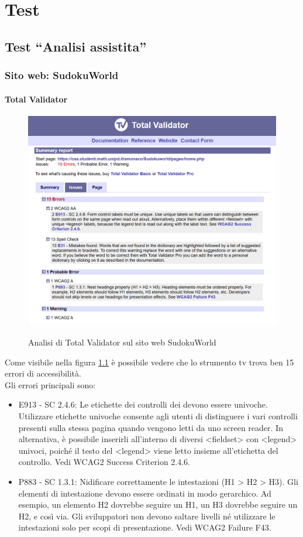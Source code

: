 \chapter{Test}
\label{chap:test}

\section{Test ``Analisi assistita''}

\subsection{Sito web: SudokuWorld}

\subsubsection{Total Validator}
\begin{figure}[H]
    \centering
    \includegraphics[width=0.7\linewidth, alt={Screenshot dell'analisi di Total Validator sul sito web SudokuWorld}]{img/TV_sudoku.png}
    \caption{Analisi di Total Validator sul sito web SudokuWorld}\label{fig:TV_sudoku}
\end{figure}

\noindent Come visibile nella figura \ref{fig:TV_sudoku} è possibile vedere che lo strumento \acrshort{tv} trova ben 15 errori di accessibilità.\\
Gli errori principali sono: 
\begin{itemize}
    \item E913 - SC 2.4.6: Le etichette dei controlli dei  devono essere univoche. Utilizzare etichette univoche consente agli utenti di distinguere i vari controlli presenti sulla stessa pagina quando vengono letti da uno screen reader. In alternativa, è possibile inserirli all’interno di diversi <fieldset> con <legend> univoci, poiché il testo del <legend> viene letto insieme all’etichetta del controllo. Vedi WCAG2 Success Criterion 2.4.6.
    \item P883 - SC 1.3.1: Nidificare correttamente le intestazioni (H1 > H2 > H3). Gli elementi di intestazione devono essere ordinati in modo gerarchico. Ad esempio, un elemento H2 dovrebbe seguire un H1, un H3 dovrebbe seguire un H2, e così via. Gli sviluppatori non devono saltare livelli né utilizzare le intestazioni solo per scopi di presentazione. Vedi WCAG2 Failure F43.
\end{itemize}

